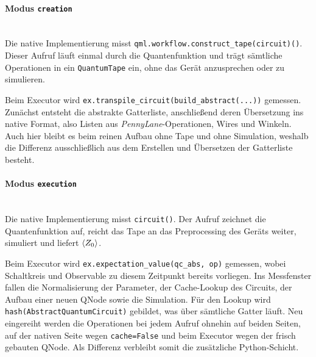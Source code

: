 \paragraph*{Modus \texttt{creation}}\mbox{}\\
Die native Implementierung misst \texttt{qml.\allowbreak workflow.\allowbreak construct\_tape\allowbreak(circuit)()}. Dieser Aufruf
läuft einmal durch die Quantenfunktion und trägt sämtliche Operationen in ein
\texttt{QuantumTape} ein, ohne das Gerät anzusprechen oder zu simulieren.

Beim Executor wird \texttt{ex.\allowbreak transpile\_circuit\allowbreak(build\_abstract\allowbreak(...))} gemessen.
Zunächst entsteht die abstrakte Gatterliste, anschließend deren Übersetzung ins
native Format, also Listen aus \textit{PennyLane}-Operationen, Wires und Winkeln.
Auch hier bleibt es beim reinen Aufbau ohne Tape und ohne Simulation, weshalb die
Differenz ausschließlich aus dem Erstellen und Übersetzen der Gatterliste besteht.

\paragraph*{Modus \texttt{execution}}\mbox{}\\
Die native Implementierung misst \texttt{circuit()}. Der Aufruf zeichnet die Quantenfunktion auf,
reicht das Tape an das Preprocessing des Geräts weiter, simuliert und liefert
$\expval{Z_0}$.

Beim Executor wird \texttt{ex.\allowbreak expectation\_value\allowbreak(qc\_abs, \allowbreak op)} gemessen, wobei
Schaltkreis und Observable zu diesem Zeitpunkt bereits vorliegen. Ins Messfenster
fallen die Normalisierung der Parameter, der Cache-Lookup des Circuits, der Aufbau
einer neuen QNode sowie die Simulation. Für den Lookup wird
\texttt{hash\allowbreak(AbstractQuantumCircuit)} gebildet, was über sämtliche Gatter läuft. Neu
eingereiht werden die Operationen bei jedem Aufruf ohnehin auf beiden Seiten, auf
der nativen Seite wegen \texttt{cache=False} und beim Executor wegen der frisch
gebauten QNode. Als Differenz verbleibt somit die zusätzliche Python-Schicht.

